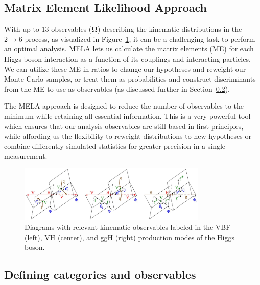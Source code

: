 \subsection{Matrix Element Likelihood Approach} \label{sec:mela}

With up to 13 observables ($\boldsymbol{\Omega}$) describing the \Hboson kinematic distributions in the $2\to 6$ process, as visualized in Figure~\ref{fig:MELA}, it can be a challenging task to perform an optimal analysis. %
MELA lets us calculate the matrix elements (ME) for each Higgs boson interaction as a function of its couplings and interacting particles. We can utilize these ME in ratios to change our hypotheses and reweight our Monte-Carlo samples, or treat them as probabilities and construct discriminants from the ME to use as observables (as discussed further in Section~\ref{sec:categories}). 

The MELA approach is designed to reduce the number of observables to the minimum while retaining all essential information. This is a very powerful tool which ensures that our analysis observables are still based in first principles, while affording us the flexibility to reweight distributions to new hypotheses or combine differently simulated statistics for greater precision in a single measurement. 

\begin{figure}[!hbt]
\centering
\includegraphics[width=0.8\textwidth,clip] {figures/MELA.jpg}
\caption{Diagrams with relevant kinematic observables labeled in the VBF (left), VH (center), and ggH (right) production modes of the Higgs boson.}
\label{fig:MELA}
\end{figure}

\subsection{Defining categories and observables} \label{sec:categories}


